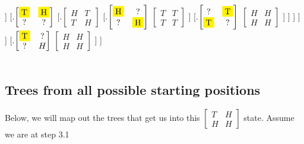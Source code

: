 \documentclass{article}
\begin{document}
            ]
            [.{$\begin{bmatrix} \colorbox{yellow}{T} & \colorbox{yellow}{H} \\ ? & ? \end{bmatrix}$} 
                [.{$\begin{bmatrix} H & T \\ T & H \end{bmatrix}$} 
                    [.{$\begin{bmatrix} \colorbox{yellow}{H} & ? \\ ? & \colorbox{yellow}{H} \end{bmatrix}$} {$\begin{bmatrix} T & T \\ T & T \end{bmatrix}$} 
                    ]
                    [.{$\begin{bmatrix} ? & \colorbox{yellow}{T} \\ \colorbox{yellow}{T} & ? \end{bmatrix}$} {$\begin{bmatrix} H & H \\ H & H \end{bmatrix}$} 
                    ]
                ]
            ]
        ]
    ]  
    [.{$\begin{bmatrix} \colorbox{yellow}{T} & ? \\ ? & H \end{bmatrix}$} {$\begin{bmatrix} H & H \\ H & H \end{bmatrix}$} 
    ]
]
\\\\
\subsection{Trees from all possible starting positions}

Below, we will map out the trees that get us into this {$\begin{bmatrix} T & H \\ H & H \end{bmatrix}$} state. Assume we are at step 3.1
\\\\
\end{document}
